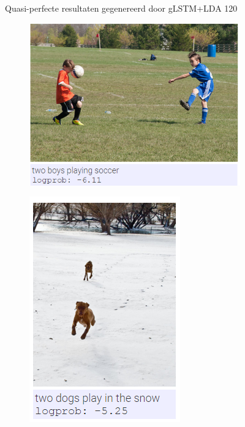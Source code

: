 \begin{figure}
\begin{subfigure}{.5\textwidth}
			\label{fig:perfectresults4}
		\end{subfigure}				
		
		\caption{Quasi-perfecte resultaten gegenereerd door gLSTM+LDA 120}
		\label{fig:perfectresults}
	\end{figure}
	
		\begin{figure}
			\begin{subfigure}{.5\textwidth}
				\centering
				\includegraphics[width=.8\linewidth]{Images/Results/Perfect/playing_soccer}
				\label{fig:perfectresults5}
			\end{subfigure}%
			\begin{subfigure}{.5\textwidth}
				\centering
				\includegraphics[width=.8\linewidth]{Images/Results/Perfect/two_dogs_in_snow}

\end{subfigure}
\end{figure}
